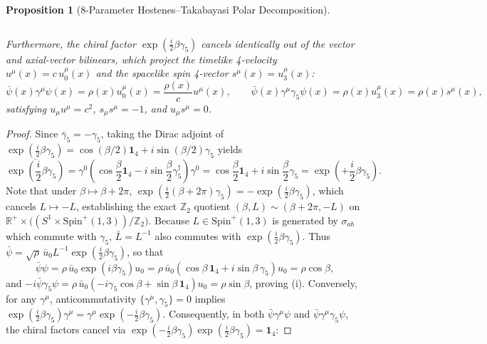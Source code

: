 \documentclass[11pt, a4paper]{article}
\newtheorem{proposition}[theorem]{Proposition}
\theoremstyle{definition}
\begin{document}
\begin{proposition}[8-Parameter Hestenes--Takabayasi Polar Decomposition]
\begin{enumerate}[label=(\roman*), nosep]
\begin{equation}
    \end{equation}
\end{enumerate}
Furthermore, the chiral factor $\exp(\frac{i}{2}\beta\gamma_5)$ cancels identically out of the vector and axial-vector bilinears, which project the timelike 4-velocity $u^\mu(x) = c\,u_0^\mu(x)$ and the spacelike spin 4-vector $s^\mu(x) = u_3^\mu(x)$:
\begin{equation}
\label{eq:vector_axial_bilinears}
\bar{\psi}(x) \gamma^\mu \psi(x) = \rho(x) u_0^\mu(x) = \frac{\rho(x)}{c} u^\mu(x), \qquad \bar{\psi}(x) \gamma^\mu \gamma_5 \psi(x) = \rho(x) u_3^\mu(x) = \rho(x) s^\mu(x),
\end{equation}
satisfying $u_\mu u^\mu = c^2$, $s_\mu s^\mu = -1$, and $u_\mu s^\mu = 0$.
\end{proposition}

\begin{proof}
Since $\bar{\gamma}_5 = -\gamma_5$, taking the Dirac adjoint of $\exp(\frac{i}{2}\beta\gamma_5) = \cos(\beta/2)\mathbf{1}_4 + i\sin(\beta/2)\gamma_5$ yields
\begin{equation}
\label{eq:chiral_adjoint}
\overline{\exp\left(\frac{i}{2}\beta\gamma_5\right)} = \gamma^0 \left( \cos\frac{\beta}{2}\mathbf{1}_4 - i\sin\frac{\beta}{2}\gamma_5^\dagger \right) \gamma^0 = \cos\frac{\beta}{2}\mathbf{1}_4 + i\sin\frac{\beta}{2}\gamma_5 = \exp\left(+\frac{i}{2}\beta\gamma_5\right).
\end{equation}
Note that under $\beta \mapsto \beta + 2\pi$, $\exp(\frac{i}{2}(\beta + 2\pi)\gamma_5) = -\exp(\frac{i}{2}\beta\gamma_5)$, which cancels $L \mapsto -L$, establishing the exact $\mathbb{Z}_2$ quotient $(\beta, L) \sim (\beta + 2\pi, -L)$ on $\mathbb{R}^+ \times \big((S^1 \times \text{Spin}^+(1,3))/\mathbb{Z}_2\big)$. Because $L \in \text{Spin}^+(1,3)$ is generated by $\sigma_{ab}$ which commute with $\gamma_5$, $\bar{L} = L^{-1}$ also commutes with $\exp(\frac{i}{2}\beta\gamma_5)$. Thus $\bar{\psi} = \sqrt{\rho}\,\bar{u}_0 L^{-1}\exp(\frac{i}{2}\beta\gamma_5)$, so that
\begin{equation}
\bar{\psi}\psi = \rho\,\bar{u}_0 \exp(i\beta\gamma_5) u_0 = \rho\,\bar{u}_0 (\cos\beta\,\mathbf{1}_4 + i\sin\beta\,\gamma_5) u_0 = \rho\cos\beta,
\end{equation}
and $-i\bar{\psi}\gamma_5\psi = \rho\,\bar{u}_0 (-i\gamma_5\cos\beta + \sin\beta\,\mathbf{1}_4)u_0 = \rho\sin\beta$, proving (i). Conversely, for any $\gamma^\mu$, anticommutativity $\{\gamma^\mu, \gamma_5\} = 0$ implies $\exp(\frac{i}{2}\beta\gamma_5)\gamma^\mu = \gamma^\mu \exp(-\frac{i}{2}\beta\gamma_5)$. Consequently, in both $\bar{\psi}\gamma^\mu\psi$ and $\bar{\psi}\gamma^\mu\gamma_5\psi$, the chiral factors cancel via $\exp(-\frac{i}{2}\beta\gamma_5)\exp(\frac{i}{2}\beta\gamma_5) = \mathbf{1}_4$:

\end{proof}
\end{document}
